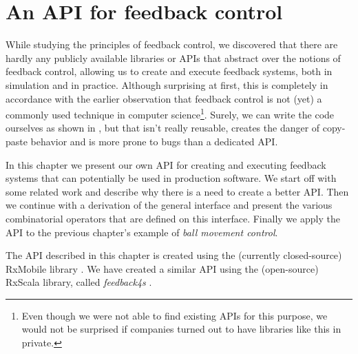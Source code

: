 \chapter{An API for feedback control}
\label{chap:feedback-api}
While studying the principles of feedback control, we discovered that there are hardly any publicly available libraries or APIs that abstract over the notions of feedback control, allowing us to create and execute feedback systems, both in simulation and in practice. Although surprising at first, this is completely in accordance with the earlier observation that feedback control is not (yet) a commonly used technique in computer science\footnote{Even though we were not able to find existing APIs for this purpose, we would not be surprised if companies turned out to have libraries like this in private.}. Surely, we can write the code ourselves as shown in , but that isn't really reusable, creates the danger of copy-paste behavior and is more prone to bugs than a dedicated API.

In this chapter we present our own API for creating and executing feedback systems that can potentially be used in production software. We start off with some related work and describe why there is a need to create a better API. Then we continue with a derivation of the general interface and present the various combinatorial operators that are defined on this interface. Finally we apply the API to the previous chapter's example of \textit{ball movement control}.

The API described in this chapter is created using the (currently closed-source) RxMobile library \cite{RxMobile}. We have created a similar API using the (open-source) RxScala library, called \textit{feedback4s} \cite{feedback4s-zenodo}.








